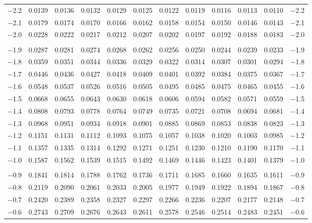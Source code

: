 \documentclass[12pt]{article}
\begin{document}
\begin{landscape}
\begin{adjustbox}{angle=270}
\begin{tabular}{r@{\hspace{4.5mm}}
	*5{c @{\hspace{2.5mm}}}@{\hspace{-0.5mm}}*5{@{\hspace{2.5mm}}c}@{\hspace{2mm}}r}
$-$2.2 & 0.0139 & 0.0136 & 0.0132 & 0.0129 & 0.0125 & 0.0122 & 0.0119 & 0.0116 & 0.0113 & 0.0110 & $-$2.2 \\
$-$2.1 & 0.0179 & 0.0174 & 0.0170 & 0.0166 & 0.0162 & 0.0158 & 0.0154 & 0.0150 & 0.0146 & 0.0143 & $-$2.1 \\
$-$2.0 & 0.0228 & 0.0222 & 0.0217 & 0.0212 & 0.0207 & 0.0202 & 0.0197 & 0.0192 & 0.0188 & 0.0183 & $-$2.0 \\
&&&&&&&&&&{} \\
$-$1.9 & 0.0287 & 0.0281 & 0.0274 & 0.0268 & 0.0262 & 0.0256 & 0.0250 & 0.0244 & 0.0239 & 0.0233 & $-$1.9 \\
$-$1.8 & 0.0359 & 0.0351 & 0.0344 & 0.0336 & 0.0329 & 0.0322 & 0.0314 & 0.0307 & 0.0301 & 0.0294 & $-$1.8 \\
$-$1.7 & 0.0446 & 0.0436 & 0.0427 & 0.0418 & 0.0409 & 0.0401 & 0.0392 & 0.0384 & 0.0375 & 0.0367 & $-$1.7 \\
$-$1.6 & 0.0548 & 0.0537 & 0.0526 & 0.0516 & 0.0505 & 0.0495 & 0.0485 & 0.0475 & 0.0465 & 0.0455 & $-$1.6 \\
$-$1.5 & 0.0668 & 0.0655 & 0.0643 & 0.0630 & 0.0618 & 0.0606 & 0.0594 & 0.0582 & 0.0571 & 0.0559 & $-$1.5 \\
$-$1.4 & 0.0808 & 0.0793 & 0.0778 & 0.0764 & 0.0749 & 0.0735 & 0.0721 & 0.0708 & 0.0694 & 0.0681 & $-$1.4 \\
$-$1.3 & 0.0968 & 0.0951 & 0.0934 & 0.0918 & 0.0901 & 0.0885 & 0.0869 & 0.0853 & 0.0838 & 0.0823 & $-$1.3 \\
$-$1.2 & 0.1151 & 0.1131 & 0.1112 & 0.1093 & 0.1075 & 0.1057 & 0.1038 & 0.1020 & 0.1003 & 0.0985 & $-$1.2 \\
$-$1.1 & 0.1357 & 0.1335 & 0.1314 & 0.1292 & 0.1271 & 0.1251 & 0.1230 & 0.1210 & 0.1190 & 0.1170 & $-$1.1 \\
$-$1.0 & 0.1587 & 0.1562 & 0.1539 & 0.1515 & 0.1492 & 0.1469 & 0.1446 & 0.1423 & 0.1401 & 0.1379 & $-$1.0 \\
&&&&&&&&&&{} \\
$-$0.9 & 0.1841 & 0.1814 & 0.1788 & 0.1762 & 0.1736 & 0.1711 & 0.1685 & 0.1660 & 0.1635 & 0.1611 & $-$0.9 \\
$-$0.8 & 0.2119 & 0.2090 & 0.2061 & 0.2033 & 0.2005 & 0.1977 & 0.1949 & 0.1922 & 0.1894 & 0.1867 & $-$0.8 \\
$-$0.7 & 0.2420 & 0.2389 & 0.2358 & 0.2327 & 0.2297 & 0.2266 & 0.2236 & 0.2207 & 0.2177 & 0.2148 & $-$0.7 \\
$-$0.6 & 0.2743 & 0.2709 & 0.2676 & 0.2643 & 0.2611 & 0.2578 & 0.2546 & 0.2514 & 0.2483 & 0.2451 & $-$0.6 \\

\end{tabular}
\end{adjustbox}
\end{landscape}
\end{document}
